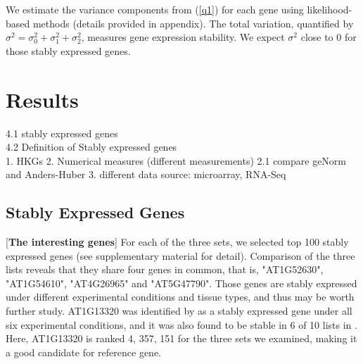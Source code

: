 \documentclass[11pt, a4paper]{article}
\begin{document}
We estimate the variance components from (\ref{q1}) for each gene using
likelihood-based methods (details provided in appendix).  The total
variation, quantified by $\sigma^2 = \sigma^2_0 + \sigma_1^2 + \sigma_2^2$, measures gene expression stability. We expect $\sigma^2$ close to 0 for those stably expressed genes.

 \section{Results}
 4.1 stably expressed genes  \\
	 
 
 4.2 Definition of Stably expressed genes\\
     1. HKGs
     2. Numerical measures (different measurements)
     2.1 compare geNorm and Anders-Huber
     3. different data source: microarray, RNA-Seq
 
 \subsection{Stably Expressed Genes}
 [\textbf{The interesting genes}]
  For each of the three sets, we selected top 100 stably expressed genes (see supplementary material for detail). %
Comparison of the three lists reveals that they share four genes in common, that is, "AT1G52630", "AT1G54610", "AT4G26965" and "AT5G47790".  Those genes are stably expressed under different experimental conditions and tissue types, and thus may be worth further study. AT1G13320 was identified by \cite{hong2010identification} as a stably expressed gene under all six experimental conditions, and it was also found to be stable in 6 of 10 lists in \cite{czechowski2005genome}.  Here, AT1G13320 is ranked 4, 357, 151 for the three sets we examined, making it a good candidate for reference gene.
\end{document}
